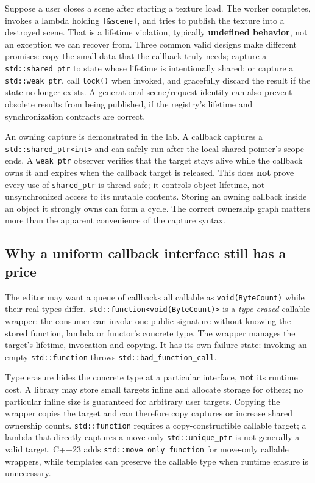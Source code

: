 Suppose a user closes a scene after starting a texture load. The worker completes, invokes a lambda holding \texttt{{[}\&scene{]}}, and tries to publish the texture into a destroyed scene. That is a lifetime violation, typically \textbf{undefined behavior}, not an exception we can recover from. Three common valid designs make different promises: copy the small data that the callback truly needs; capture a \texttt{std::shared\_ptr} to state whose lifetime is intentionally shared; or capture a \texttt{std::weak\_ptr}, call \texttt{lock()} when invoked, and gracefully discard the result if the state no longer exists. A generational scene/request identity can also prevent obsolete results from being published, if the registry's lifetime and synchronization contracts are correct.

An owning capture is demonstrated in the lab. A callback captures a \texttt{std::shared\_ptr\textless{}int\textgreater{}} and can safely run after the local shared pointer's scope ends. A \texttt{weak\_ptr} observer verifies that the target stays alive while the callback owns it and expires when the callback target is released. This does \textbf{not} prove every use of \texttt{shared\_ptr} is thread-safe; it controls object lifetime, not unsynchronized access to its mutable contents. Storing an owning callback inside an object it strongly owns can form a cycle. The correct ownership graph matters more than the apparent convenience of the capture syntax.

\subsection{Why a uniform callback interface still has a price}\label{05-engine-i-ch004-why-a-uniform-callback-interface-still-has-a-price}

\hypertarget{05-engine-i-ch004-why-a-uniform-callback-interface-still-has-a-price}{}

The editor may want a queue of callbacks all callable as \texttt{void(ByteCount)} while their real types differ. \texttt{std::function\textless{}void(ByteCount)\textgreater{}} is a \emph{type-erased} callable wrapper: the consumer can invoke one public signature without knowing the stored function, lambda or functor's concrete type. The wrapper manages the target's lifetime, invocation and copying. It has its own failure state: invoking an empty \texttt{std::function} throws \texttt{std::bad\_function\_call}.

Type erasure hides the concrete type at a particular interface, \textbf{not} its runtime cost. A library may store small targets inline and allocate storage for others; no particular inline size is guaranteed for arbitrary user targets. Copying the wrapper copies the target and can therefore copy captures or increase shared ownership counts. \texttt{std::function} requires a copy-constructible callable target; a lambda that directly captures a move-only \texttt{std::unique\_ptr} is not generally a valid target. C++23 adds \texttt{std::move\_only\_function} for move-only callable wrappers, while templates can preserve the callable type when runtime erasure is unnecessary.

